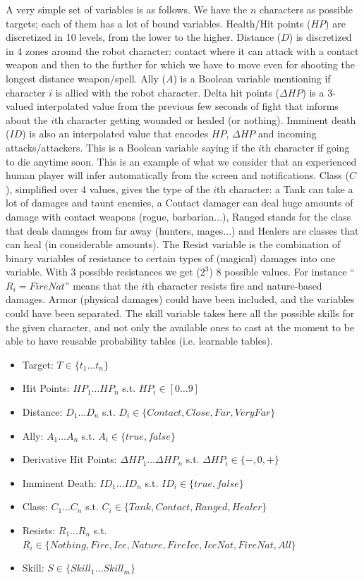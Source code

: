 A very simple set of variables is as follows. We have the $n$ characters as possible targets; each of them has a lot of bound variables. Health/Hit points ($HP$) are discretized in 10 levels, from the lower to the higher. Distance ($D$) is discretized in 4 zones around the robot character: contact where it can attack with a contact weapon and then to the further for which we have to move even for shooting the longest distance weapon/spell. Ally ($A$) is a Boolean variable mentioning if character $i$ is allied with the robot character. Delta hit points ($\Delta HP$) is a 3-valued interpolated value from the previous few seconds of fight that informs about the $i$th character getting wounded or healed (or nothing). Imminent death ($ID$) is also an interpolated value that encodes $HP$, $\Delta HP$ and incoming attacks/attackers. This is a Boolean variable saying if the $i$th character if going to die anytime soon. This is an example of what we consider that an experienced human player will infer automatically from the screen and notifications. Class ($C$), simplified over 4 values, gives the type of the $i$th character: a Tank can take a lot of damages and taunt enemies, a Contact damager can deal huge amounts of damage with contact weapons (rogue, barbarian...), Ranged stands for the class that deals damages from far away (hunters, mages...) and Healers are classes that can heal (in considerable amounts). The Resist variable is the combination of binary variables of resistance to certain types of (magical) damages into one variable. With 3 possible resistances we get ($2^3$) 8 possible values. For instance ``$R_i=FireNat$'' means that the $i$th character resists fire and nature-based damages. Armor (physical damages) could have been included, and the variables could have been separated. The skill variable takes here all the possible skills for the given character, and not only the available ones to cast at the moment to be able to have reusable probability tables (i.e. learnable tables).

\begin{itemize}
    \item Target: $T \in \{t_1\dots t_n\}$
    \item Hit Points: $HP_1 \dots HP_n$ s.t. $HP_i \in [0\dots 9]$
    \item Distance: $D_1 \dots D_n$ s.t. $D_i \in \{Contact, Close, Far, VeryFar\}$
    \item Ally: $A_1 \dots A_n$ s.t. $A_i \in \{true, false\}$
    \item Derivative Hit Points: $\Delta HP_1 \dots \Delta HP_n$ s.t. $\Delta HP_i \in \{-, 0, +\}$
    \item Imminent Death: $ID_1 \dots ID_n$ s.t. $ID_i \in \{true, false\}$
    \item Class: $C_1 \dots C_n$ s.t. $C_i \in \{Tank, Contact, Ranged, Healer\}$
    \item Resists: $R_1 \dots R_n$ s.t. $R_i \in \{Nothing, Fire, Ice, Nature, FireIce, IceNat, FireNat, All\}$
    \item Skill: $S \in \{Skill_1 \dots Skill_m\}$
\end{itemize}

